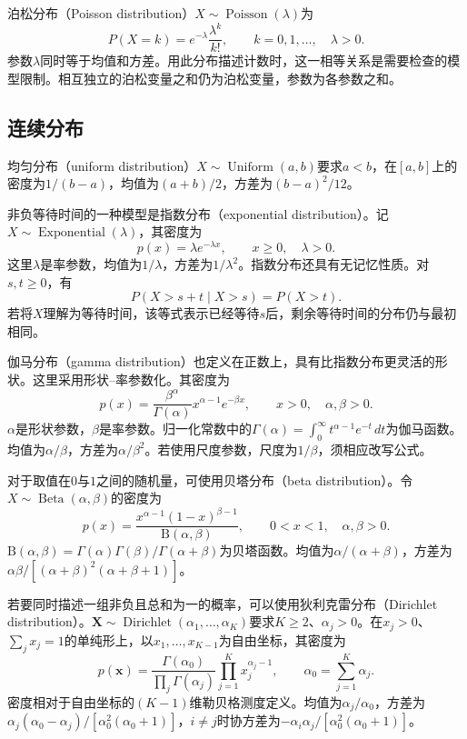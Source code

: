 泊松分布（Poisson distribution）$X\sim\operatorname{Poisson}(\lambda)$为
\begin{equation}
 P(X=k)=e^{-\lambda}\frac{\lambda^k}{k!},\qquad k=0,1,\ldots,\quad\lambda>0.
\end{equation}
参数$\lambda$同时等于均值和方差。用此分布描述计数时，这一相等关系是需要检查的模型限制。相互独立的泊松变量之和仍为泊松变量，参数为各参数之和。

\subsection{连续分布}
均匀分布（uniform distribution）$X\sim\operatorname{Uniform}(a,b)$要求$a<b$，在$[a,b]$上的密度为$1/(b-a)$，均值为$(a+b)/2$，方差为$(b-a)^2/12$。

非负等待时间的一种模型是指数分布（exponential distribution）。记$X\sim\operatorname{Exponential}(\lambda)$，其密度为
\begin{equation}
 p(x)=\lambda e^{-\lambda x},\qquad x\geq0,\quad\lambda>0.
\end{equation}
这里$\lambda$是率参数，均值为$1/\lambda$，方差为$1/\lambda^2$。指数分布还具有无记忆性质。对$s,t\geq0$，有
\begin{equation}
 P(X>s+t\mid X>s)=P(X>t).
\end{equation}
若将$X$理解为等待时间，该等式表示已经等待$s$后，剩余等待时间的分布仍与最初相同。

伽马分布（gamma distribution）也定义在正数上，具有比指数分布更灵活的形状。这里采用形状--率参数化。其密度为
\begin{equation}
 p(x)=\frac{\beta^\alpha}{\Gamma(\alpha)}x^{\alpha-1}e^{-\beta x},
 \qquad x>0,\quad\alpha,\beta>0.
\end{equation}
$\alpha$是形状参数，$\beta$是率参数。归一化常数中的$\Gamma(\alpha)=\int_0^\infty t^{\alpha-1}e^{-t}\,dt$为伽马函数。均值为$\alpha/\beta$，方差为$\alpha/\beta^2$。若使用尺度参数，尺度为$1/\beta$，须相应改写公式。

对于取值在$0$与$1$之间的随机量，可使用贝塔分布（beta distribution）。令$X\sim\operatorname{Beta}(\alpha,\beta)$的密度为
\begin{equation}
 p(x)=\frac{x^{\alpha-1}(1-x)^{\beta-1}}{\mathrm B(\alpha,\beta)},
 \qquad0<x<1,\quad\alpha,\beta>0.
\end{equation}
$\mathrm B(\alpha,\beta)=\Gamma(\alpha)\Gamma(\beta)/\Gamma(\alpha+\beta)$为贝塔函数。均值为$\alpha/(\alpha+\beta)$，方差为$\alpha\beta/[(\alpha+\beta)^2(\alpha+\beta+1)]$。

若要同时描述一组非负且总和为一的概率，可以使用狄利克雷分布（Dirichlet distribution）。$\bm X\sim\operatorname{Dirichlet}(\alpha_1,\ldots,\alpha_K)$要求$K\geq2$、$\alpha_j>0$。在$x_j>0$、$\sum_jx_j=1$的单纯形上，以$x_1,\ldots,x_{K-1}$为自由坐标，其密度为
\begin{equation}
 p(\bm x)=\frac{\Gamma(\alpha_0)}{\prod_j\Gamma(\alpha_j)}\prod_{j=1}^Kx_j^{\alpha_j-1},
 \qquad\alpha_0=\sum_{j=1}^K\alpha_j.
\end{equation}
密度相对于自由坐标的$(K-1)$维勒贝格测度定义。均值为$\alpha_j/\alpha_0$，方差为$\alpha_j(\alpha_0-\alpha_j)/[\alpha_0^2(\alpha_0+1)]$，$i\ne j$时协方差为$-\alpha_i\alpha_j/[\alpha_0^2(\alpha_0+1)]$。

